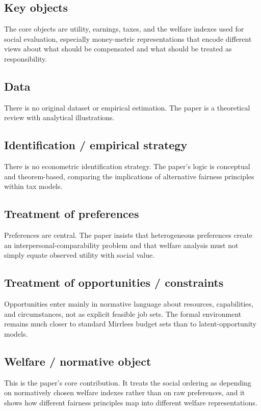 \documentclass[11pt,a4paper]{article}
\begin{document}
\subsection*{Key objects}
The core objects are utility, earnings, taxes, and the welfare indexes used for social evaluation, especially money-metric representations that encode different views about what should be compensated and what should be treated as responsibility.

\subsection*{Data}
There is no original dataset or empirical estimation. The paper is a theoretical review with analytical illustrations.

\subsection*{Identification / empirical strategy}
There is no econometric identification strategy. The paper’s logic is conceptual and theorem-based, comparing the implications of alternative fairness principles within tax models.

\subsection*{Treatment of preferences}
Preferences are central. The paper insists that heterogeneous preferences create an interpersonal-comparability problem and that welfare analysis must not simply equate observed utility with social value.

\subsection*{Treatment of opportunities / constraints}
Opportunities enter mainly in normative language about resources, capabilities, and circumstances, not as explicit feasible job sets. The formal environment remains much closer to standard Mirrlees budget sets than to latent-opportunity models.

\subsection*{Welfare / normative object}
This is the paper’s core contribution. It treats the social ordering as depending on normatively chosen welfare indexes rather than on raw preferences, and it shows how different fairness principles map into different welfare representations.
\end{document}
